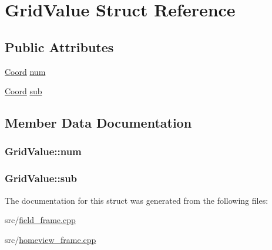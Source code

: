 \hypertarget{a00106}{\section{Grid\-Value Struct Reference}
\label{a00106}
}
\subsection*{Public Attributes}
\begin{DoxyCompactItemize}
\item 
\hyperlink{a00216_acd9dae57b712df0e2d3588c0c4798c11}{Coord} \hyperlink{a00106_a763f613f7cd470746f54b45fdc5b9901}{num}
\item 
\hyperlink{a00216_acd9dae57b712df0e2d3588c0c4798c11}{Coord} \hyperlink{a00106_a5fd925ad54ded29309151752e4f3d073}{sub}
\end{DoxyCompactItemize}


\subsection{Member Data Documentation}
\hypertarget{a00106_a763f613f7cd470746f54b45fdc5b9901}{
\subsubsection[{num}]{ Grid\-Value\-::num}}\label{a00106_a763f613f7cd470746f54b45fdc5b9901}
\hypertarget{a00106_a5fd925ad54ded29309151752e4f3d073}{
\subsubsection[{sub}]{ Grid\-Value\-::sub}}\label{a00106_a5fd925ad54ded29309151752e4f3d073}


The documentation for this struct was generated from the following files\-:\begin{DoxyCompactItemize}
\item 
src/\hyperlink{a00226}{field\-\_\-frame.\-cpp}\item 
src/\hyperlink{a00230}{homeview\-\_\-frame.\-cpp}\end{DoxyCompactItemize}
